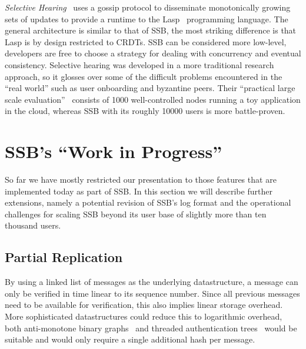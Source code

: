 \documentclass[9pt,sigconf,rewiew]{acmart}
\begin{document}
\textit{Selective Hearing}~\cite{meiklejohn2015selective} uses a gossip protocol to disseminate monotonically growing sets of updates to provide a runtime to the Lasp~\cite{meiklejohn2015lasp} programming language. The general architecture is similar to that of SSB, the most striking difference is that Lasp is by design restricted to CRDTs. SSB can be considered more low-level, developers are free to choose a strategy for dealing with concurrency and eventual consistency. Selective hearing was developed in a more traditional research approach, so it glosses over some of the difficult problems encountered in the ``real world'' such as user onboarding and byzantine peers. Their ``practical large scale evaluation''~\cite{meiklejohn2017lasp} consists of 1000 well-controlled nodes running a toy application in the cloud, whereas SSB with its roughly 10000 users is more battle-proven.



\section{SSB's ``Work in Progress''}
\label{sec:wip}

So far we have mostly restricted our presentation to those features that are implemented today as part of SSB. In this section we will describe further extensions, namely a potential revision of SSB's log format and the operational challenges for scaling SSB beyond its user base of slightly more than ten thousand users.


\subsection{Partial Replication}

By using a linked list of messages as the underlying datastructure, a message can only be verified in time linear to its sequence number. Since all previous messages need to be available for verification, this also implies linear storage overhead. More sophisticated datastructures could reduce this to logarithmic overhead, both anti-monotone binary graphs~\cite{buldas1998new} and threaded authentication trees~\cite{buldas2000optimally} would be suitable and would only require a single additional hash per message.
\end{document}
